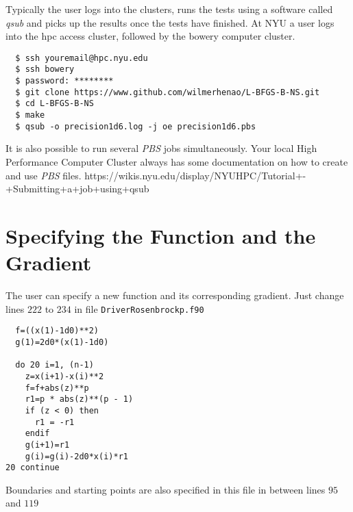 Typically the user logs into the clusters, runs the tests using a software called \emph{qsub} and picks up the results once the tests have finished. At NYU a user logs into the hpc access cluster, followed by the bowery computer cluster.

\begin{lstlisting}
  $ ssh youremail@hpc.nyu.edu
  $ ssh bowery
  $ password: ********
  $ git clone https://www.github.com/wilmerhenao/L-BFGS-B-NS.git
  $ cd L-BFGS-B-NS
  $ make
  $ qsub -o precision1d6.log -j oe precision1d6.pbs
\end{lstlisting}

It is also possible to run several \emph{PBS} jobs simultaneously. Your local High Performance Computer Cluster always has some documentation on how to create and use \emph{PBS} files. https://wikis.nyu.edu/display/NYUHPC/Tutorial+-+Submitting+a+job+using+qsub

\section{Specifying the Function and the Gradient}

The user can specify a new function and its corresponding gradient. Just change lines $222$ to $234$ in file \texttt{DriverRosenbrockp.f90} 


\begin{lstlisting}
  f=((x(1)-1d0)**2)
  g(1)=2d0*(x(1)-1d0)
  
  do 20 i=1, (n-1)
    z=x(i+1)-x(i)**2
    f=f+abs(z)**p
    r1=p * abs(z)**(p - 1)
    if (z < 0) then
      r1 = -r1
    endif
    g(i+1)=r1
    g(i)=g(i)-2d0*x(i)*r1
20 continue
\end{lstlisting}

Boundaries and starting points are also specified in this file in between lines $95$ and $119$
